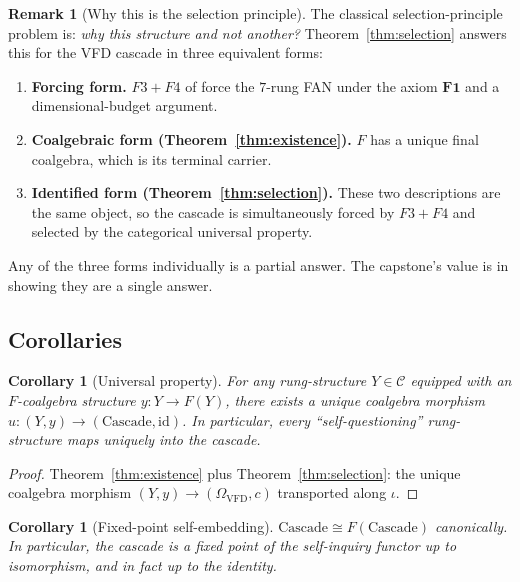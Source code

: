 \documentclass[11pt, a4paper]{amsart}
\newtheorem{corollary}[theorem]{Corollary}
\theoremstyle{definition}
\newtheorem{remark}[theorem]{Remark}
\newcommand{\catC}{\mathcal{C}}
\newcommand{\Omegacap}{\Omega_{\mathrm{VFD}}}
\begin{document}
\begin{remark}[Why this is the selection principle]
\label{rmk:why-selection}
The classical selection-principle problem is: \emph{why this
structure and not another?} Theorem~\ref{thm:selection} answers
this for the VFD cascade in three equivalent forms:
\begin{enumerate}
\item \textbf{Forcing form.} $F3+F4$ of
  \cite{CascadeCompletenessAudit} force the $7$-rung FAN under
  the axiom $\mathbf{F1}$ and a dimensional-budget argument.
\item \textbf{Coalgebraic form
  (Theorem~\ref{thm:existence}).} $F$ has a unique final
  coalgebra, which is its terminal carrier.
\item \textbf{Identified form
  (Theorem~\ref{thm:selection}).} These two descriptions are
  the same object, so the cascade is simultaneously forced by
  $F3+F4$ and selected by the categorical universal property.
\end{enumerate}
Any of the three forms individually is a partial answer. The
capstone's value is in showing they are a single answer.
\end{remark}

\subsection{Corollaries}

\begin{corollary}[Universal property]
\label{cor:universal-property}
For any rung-structure $Y \in \catC$ equipped with an
$F$-coalgebra structure $y \colon Y \to F(Y)$, there exists a
unique coalgebra morphism $u \colon (Y, y) \to
(\mathrm{Cascade}, \mathrm{id})$. In particular, every
``self-questioning'' rung-structure maps uniquely into the
cascade.
\end{corollary}

\begin{proof}
Theorem~\ref{thm:existence} plus Theorem~\ref{thm:selection}:
the unique coalgebra morphism $(Y, y) \to (\Omegacap, c)$
transported along $\iota$.
\end{proof}

\begin{corollary}[Fixed-point self-embedding]
\label{cor:fixed-point}
$\mathrm{Cascade} \cong F(\mathrm{Cascade})$ canonically. In
particular, the cascade is a fixed point of the self-inquiry
functor up to isomorphism, and in fact up to the identity.
\end{corollary}
\end{document}

